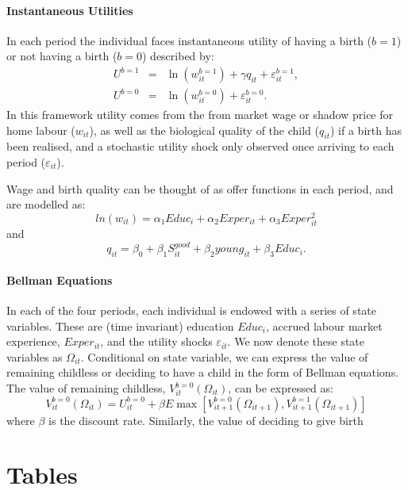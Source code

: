 \documentclass[a4paper, 11 pt]{article}
\theoremstyle{plain}
\begin{document}
\begin{spacing}{1.2}
\paragraph{Instantaneous Utilities}
In each period the individual faces instantaneous utility of having a birth
($b=1$) or not having a birth ($b=0$) described by:
\begin{eqnarray}
U^{b=1}&=&\ln(w_{it}^{b=1}) + \gamma q_{it} + \varepsilon^{b=1}_{it}, \nonumber \\
U^{b=0}&=&\ln(w_{it}^{b=0}) + \varepsilon^{b=0}_{it}. \nonumber 
\end{eqnarray}
In this framework utility comes from the from market wage or shadow price for 
home labour ($w_{it}$), as well as the biological quality of the child ($q_{it}$)
if a birth has been realised, and a stochastic utility shock only observed once 
arriving to each period ($\varepsilon_{it}$).

Wage and birth quality can be thought of as offer functions in each period, and 
are modelled as:
\[
ln(w_{it})=\alpha_1 Educ_{i} + \alpha_2 Exper_{it} + \alpha_3 Exper_{it}^2
\]
and
\[
q_{it} = \beta_0 + \beta_1 S^{good}_{it} + \beta_2 young_{it} + \beta_3 Educ_{i}.
\]

\paragraph{Bellman Equations} In each of the four periods, each individual 
is endowed with a series of state variables.  These are (time invariant) 
education $Educ_i$, accrued labour market experience, $Exper_{it}$, and the 
utility shocks $\varepsilon_{it}$.  We now denote these state variables as 
$\Omega_{it}$.  Conditional on state variable, we can express the value of
remaining childless or deciding to have a child in the form of Bellman 
equations.  The value of remaining childless, $V_{it}^{b=0}(\Omega_{it})$, 
can be expressed as:
\begin{equation}
\label{beEqn:VF0}
V_{it}^{b=0}(\Omega_{it})=U_{it}^{b=0}+\beta E\max
                         [V_{it+1}^{b=0}(\Omega_{it+1}),V_{it+1}^{b=1}(\Omega_{it+1})]
\end{equation}
where $\beta$ is the discount rate.  Similarly, the value of deciding to
give birth 

\newpage

\newpage
\section*{Tables}



\end{spacing}
\end{document}

